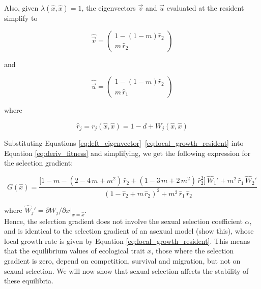 Also, given $\lambda(\hat{x}, \hat{x}) = 1$, the eigenvectors $\overrightarrow{v}$ and $\overrightarrow{u}$ evaluated at the resident simplify to

\begin{equation}
    \hat{\overrightarrow{v}} = 
    \begin{pmatrix}
        1 - (1-m)\hat{r}_2\\
        m \, \hat{r}_2
    \end{pmatrix}
    \label{eq:left_eigenvector_resident}
\end{equation}

and

\begin{equation}
    \hat{\overrightarrow{u}} = 
    \begin{pmatrix}
        1 - (1-m)\hat{r}_2\\
        m \, \hat{r}_1
    \end{pmatrix}
    \label{eq:right_eigenvector_resident}
\end{equation}

where 

\begin{equation}
    \hat{r}_j = r_j(\hat{x}, \hat{x}) = 1 - d + W_j(\hat{x}, \hat{x})
    \label{eq:local_growth_resident}
\end{equation}

Substituting Equations \ref{eq:left_eigenvector}--\ref{eq:local_growth_resident} into Equation \ref{eq:deriv_fitness} and simplifying, we get the following expression for the selection gradient:

\begin{equation}
    G(\hat{x}) = \frac{\big[1-m-(2-4\,m+m^2)\,\hat{r}_2+(1-3\,m+2\,m^2)\,\hat{r}^2_2\big]\, \hat{W}_1' + m^2\,\hat{r}_1\,\hat{W}_2'}{(1-\hat{r}_2+m\,\hat{r}_2)^2 + m^2\,\hat{r}_1\,\hat{r}_2}
    \label{eq:fitness_gradient_expression}
\end{equation}

where $\hat{W}_j' = \partial W_j / \partial x |_{x = \hat{x}}$.\\

Hence, the selection gradient does not involve the sexual selection coefficient $\alpha$, and is identical to the selection gradient of an asexual model (show this), whose local growth rate is given by Equation \ref{eq:local_growth_resident}. This means that the equilibrium values of ecological trait $x$, those where the selection gradient is zero, depend on competition, survival and migration, but not on sexual selection. We will now show that sexual selection affects the stability of these equilibria.

